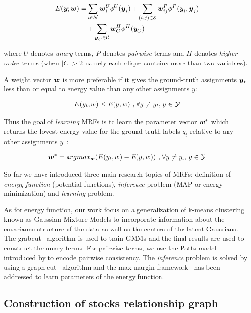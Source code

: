 \begin{align}
  \label{eq:energyfunction_UPH}
  E(\by;\bw)=&\sum_{i\in \N}{\bw_i^U\phi^U(\by_i)}+
               \sum_{(i,j)\in \E}{\bw_{ij}^P\phi^P(\by_i,\by_j)} \notag \\
               &+\sum_{\by_C\in \C}{\bw_C^H\phi^H(\by_C)}
\end{align}

\noindent where $U$ denotes \emph{unary} terms, $P$ denotes
\emph{pairwise} terms and $H$ denotes \emph{higher order} terms
(when $|C|>2$ namely each clique contains more than two
variables).

A weight vector ${\boldsymbol{w}}$ is more preferable if it gives the
ground-truth assignments ${\boldsymbol{y}}_t$ less than or equal to energy
value than any other assignments $y$:

\begin{align}
E(y_t,w)\leq E(y,w)~ \text{,~}\forall y \neq y_t
\text{,~} y\in \Y
\end{align}


Thus the goal of \emph{learning} MRFs is to learn the parameter
vector ${\boldsymbol{w}}^*$ which returns the lowest energy value for the
ground-truth labels $y_t$ relative to any other assignments
$y$~\cite{Szummer:ECCV08}:

\begin{align}
\bw^* = argmax_{\bw}(E(y_t,w)-E(y,w))~ \text{,~}\forall y \neq y_t
\text{,~} y\in \Y
\end{align}

So far we have introduced three main research topics of MRFs:
definition of \emph{energy function} (potential functions),
\emph{inference} problem (MAP or energy minimization) and
\emph{learning} problem.

As for energy function, our work focus on a generalization of
k-means clustering known as Gaussian Mixture Models to
incorporate information about the covariance structure of the
data as well as the centers of the latent Gaussians. The
grabcut~\cite{Rother:SIGGRAPH04} algorithm is used to train GMMs
and the final results are used to construct the unary terms. For
pairwise terms, we use the Potts model introduced by
 to encode pairwise consistency. The
\emph{inference} problem is solved by using a
graph-cut~\cite{Boykov:ICCV99, Boykov:PAMI04} algorithm and the
max margin framework~\cite{tsochantaridis2005large} has been
addressed to learn parameters of the energy function.

\subsection{Construction of stocks relationship graph}
\label{sec:con_stock_graph}

